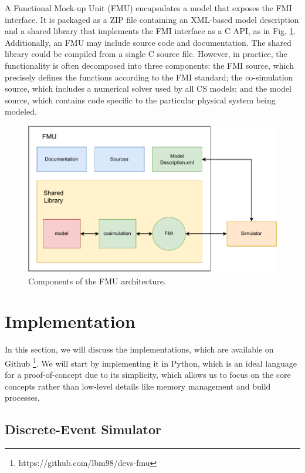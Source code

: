 \documentclass[conference]{IEEEtran}
\begin{document}
A Functional Mock-up Unit (FMU) encapsulates a model that exposes the FMI interface.
It is packaged as a ZIP file containing an XML-based model description and a shared library that implements the FMI interface as a C API, as in Fig. \ref{FMU-architecture}.
Additionally, an FMU may include source code and documentation.
The shared library could be compiled from a single C source file.
However, in practice, the functionality is often decomposed into three components: the FMI source, which precisely defines the functions according to the FMI standard; the co-simulation source, which includes a numerical solver used by all CS models; and the model source, which contains code specific to the particular physical system being modeled.

\begin{figure}[htbp]
  \centering
  \includegraphics[width=\linewidth]{images/FMU-architecture.drawio.pdf}
  \caption{Components of the FMU architecture.}
  \label{FMU-architecture}
\end{figure}

\section{Implementation}

In this section, we will discuss the implementations, which are available on Github \footnote{https://github.com/lbm98/devs-fmu}.
We will start by implementing it in Python, which is an ideal language for a proof-of-concept due to its simplicity, which allows us to focus on the core concepts rather than low-level details like memory management and build processes.

\subsection{Discrete-Event Simulator}
\end{document}
